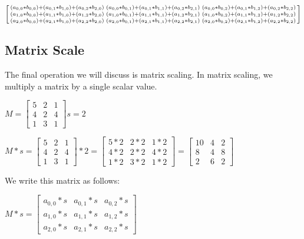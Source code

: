 \documentclass[12pt]{article}
\begin{document}
\begin{center}
$
\begin{bsmallmatrix} 
		         (a_{0, 0} * b_{0, 0}) + (a_{0, 1} * b_{1, 0}) + (a_{0, 2} * b_{2, 0}) & 
                          (a_{0, 0} * b_{0, 1}) + (a_{0, 1} * b_{1, 1}) + (a_{0, 2} * b_{2, 1}) & 
                          (a_{0, 0} * b_{0, 2}) + (a_{0, 1} * b_{1, 2}) + (a_{0, 2} * b_{2, 2}) \\
                          (a_{1, 0} * b_{0, 0}) + (a_{1, 1} * b_{1, 0}) + (a_{1, 2} * b_{2, 0}) & 
                          (a_{1, 0} * b_{0, 1}) + (a_{1, 1} * b_{1, 1}) + (a_{1, 2} * b_{2, 1}) & 
                          (a_{1, 0} * b_{0, 2}) + (a_{1, 1} * b_{1, 2}) + (a_{1, 2} * b_{2, 2}) \\
                          (a_{2, 0} * b_{0, 0}) + (a_{2, 1} * b_{1, 0}) + (a_{2, 2} * b_{2, 0}) & 
                          (a_{2, 0} * b_{0, 1}) + (a_{2, 1} * b_{1, 1}) + (a_{2, 2} * b_{2, 1}) & 
                          (a_{2, 0} * b_{0, 2}) + (a_{2, 1} * b_{1, 2}) + (a_{2, 2} * b_{2, 2}) \\
 \end{bsmallmatrix}
$
\end{center}

\subsection{Matrix Scale}

The final operation we will discuss is matrix scaling. In matrix scaling, we multiply a matrix by a single scalar value.
\begin{center}
$M = \begin{bmatrix} 5 & 2 & 1 \\ 4 & 2 & 4 \\ 1 & 3 & 1 \end{bmatrix}
  s = 2
$
\end{center}
\begin{center}
$M * s =
 \begin{bmatrix} 5 & 2 & 1 \\ 4 & 2 & 4 \\ 1 & 3 & 1 \end{bmatrix}  *
  2 = 
  \begin{bmatrix} 5 * 2 & 2 * 2 & 1 * 2 \\ 
                           4 * 2 & 2 * 2 & 4 * 2 \\ 
                           1 * 2 & 3 * 2 & 1 * 2
  \end{bmatrix} =
  \begin{bmatrix} 10 & 4 & 2 \\ 8 & 4 & 8 \\ 2 & 6 & 2 \end{bmatrix}
$
\end{center}
We write this matrix as follows:
\begin{center}
$M * s=
 \begin{bmatrix} a_{0, 0} * s & a_{0, 1} * s & a_{0, 2} * s \\
 		         a_{1, 0} * s & a_{1, 1} * s & a_{1, 2} * s \\
		         a_{2, 0} * s & a_{2, 1} * s & a_{2, 2} * s
 \end{bmatrix}
$
\end{center}
\end{document}
